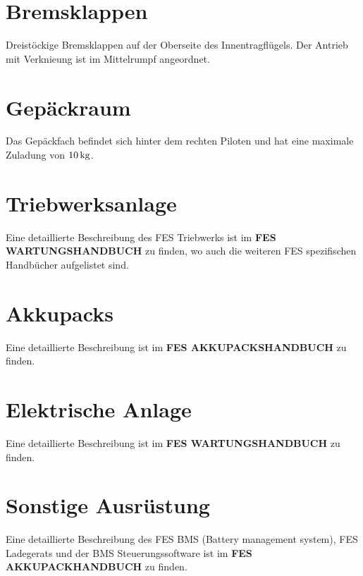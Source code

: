 \section{Bremsklappen}
Dreistöckige Bremsklappen auf der Oberseite des Innentragflügels. Der Antrieb mit Verknieung ist im Mittelrumpf angeordnet.

\section{Gepäckraum}
Das Gepäckfach befindet sich hinter dem rechten Piloten und hat eine maximale Zuladung von $\unit[10]{kg}$.

\section{Triebwerksanlage}
Eine detaillierte Beschreibung des FES Triebwerks ist im \textbf{FES WARTUNGSHANDBUCH} zu finden, wo auch die weiteren FES spezifischen Handbücher
aufgelistet sind.

\section{Akkupacks}
Eine detaillierte Beschreibung ist im \textbf{FES AKKUPACKSHANDBUCH} zu finden.

\section{Elektrische Anlage}
Eine detaillierte Beschreibung ist im \textbf{FES WARTUNGSHANDBUCH} zu finden.

\section{Sonstige Ausrüstung}
Eine detaillierte Beschreibung des FES BMS (Battery management system), FES Ladegerats und der BMS Steuerungssoftware ist im \textbf{FES AKKUPACKHANDBUCH} zu
finden.
